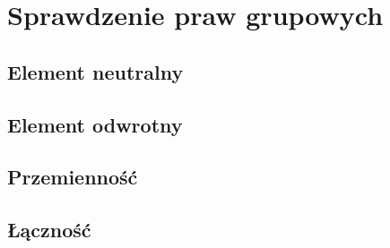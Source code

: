 \section{Sprawdzenie praw grupowych}

\subsection*{Element neutralny}


\subsection*{Element odwrotny}


\subsection*{Przemienność}


\subsection*{Łączność}

